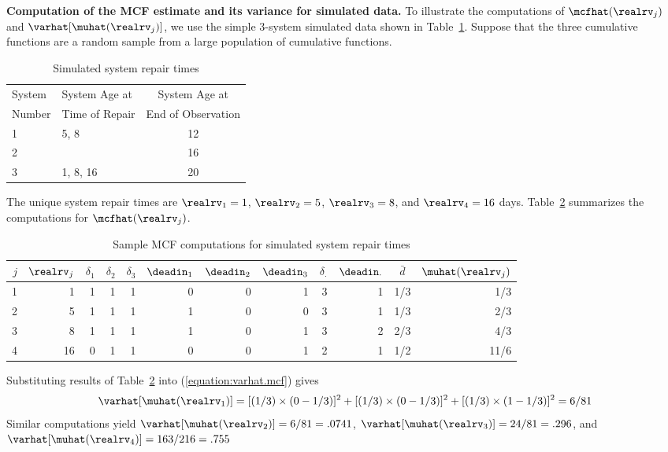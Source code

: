 \begin{example}
\label{example:simple.var.mcf}
{\bf Computation of the MCF estimate and its variance for simulated
data.} To illustrate the computations of
$\mcfhat(\realrv_{j})$ and $\varhat[\muhat(\realrv_{j})]$, we use the
simple 3-system simulated data shown in
Table~\ref{table:toy.repair.dat}. Suppose that the three cumulative
functions are a random sample from a large population of cumulative
functions.
\begin{table}
\caption{Simulated system repair times}
\centering\small
\begin{tabular}{llc}
\\[-.5ex]
\hline
System & System Age at  & \multicolumn{1}{c}{System Age at} 
\\
Number       &Time of Repair & \multicolumn{1}{c}{End of Observation}
\\
\hline
1 & 5,  8       & 12
\\
2 &             & 16
\\
3 & 1,  8,  16  & 20
\\
\hline
\end{tabular}
\label{table:toy.repair.dat}
\end{table}
The unique system repair times are
$\realrv_{1}=1$, $\realrv_{2}=5$, $\realrv_{3}=8$, and 
$\realrv_{4}=16$ days.
Table~\ref{table:toy.repair.compute} summarizes the computations
for $\mcfhat(\realrv_{j})$.
\begin{table}
\caption{Sample MCF computations for simulated system repair times}
\centering\small
\begin{tabular}{rr|rrr|rrr|rrr|r}
\\[-.5ex]
\hline
$j$&$\realrv_{j}$ & $\delta_{1}$ & $\delta_{2}$ & $\delta_{3}$ & $\deadin_{1}$ & $\deadin_{2}$ & $\deadin_{3}$ & $\delta_{\cdot}$ & $\deadin_{\cdot}$ &
\multicolumn{1}{c}{$\bar{d}$} &\multicolumn{1}{|c}{$\muhat(\realrv_{j})$}
\\[1ex]
\hline
1& 1 & 1 & 1 & 1 & 0 & 0 & 1 & 3 & 1 & 1/3& 1/3
\\
2& 5 & 1 & 1 & 1 & 1 & 0 & 0 & 3 & 1 & 1/3& 2/3
\\
3& 8 & 1 & 1 & 1 & 1 & 0 & 1 & 3 & 2 & 2/3& 4/3
\\
4&16 & 0 & 1 & 1 & 0 & 0 & 1 & 2 & 1 & 1/2& 11/6
\\
\hline
\end{tabular}
\label{table:toy.repair.compute}
\end{table}
Substituting results of Table~\ref{table:toy.repair.compute} 
into (\ref{equation:varhat.mcf}) gives
\begin{displaymath}
\varhat[\muhat(\realrv_{1})]=
[(1/3)\times (0-1/3)]^{2}+[(1/3)\times (0-1/3)]^{2}+ [(1/3)\times
(1-1/3)]^{2}=6/81
\end{displaymath}
Similar computations yield
$\varhat[\muhat(\realrv_{2})]=6/81=.0741$,
$\varhat[\muhat(\realrv_{3})]=24/81=.296$, and
$\varhat[\muhat(\realrv_{4})]=163/216=.755$
\end{example}


